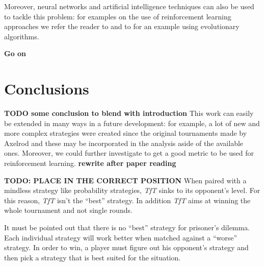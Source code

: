\documentclass[journal,a4paper,10pt,twoside]{IEEEtran} %
\begin{document}
Moreover, neural networks and artificial intelligence techniques can also be used to tackle this problem: for examples on the use of reinforcement learning approaches we refer the reader to \cite{sandholmRL,plosRLdominant,coopSeqRL,kedaoRL} and to \cite{shashiEvoAlg} for an example using evolutionary algorithms.

\textbf{Go on}


\section{Conclusions} \label{s:conc}
\textbf{TODO some conclusion to blend with introduction}
This work can easily be extended in many ways in a future development: for example, a lot of new and more complex strategies were created since the original tournaments made by Axelrod and these may be incorporated in the analysis aside of the available ones.
Moreover, we could further investigate to get a good metric to be used for reinforcement learning. \textbf{rewrite after paper reading}

\textbf{TODO: PLACE IN THE CORRECT POSITION}
When paired with a mindless strategy like probability strategies, \textit{TfT} sinks to its opponent's level. For this reason, \textit{TfT} isn't the ``best'' strategy. In addition \textit{TfT} aims at winning the whole tournament and not single rounds.

It must be pointed out that there is no ``best'' strategy for prisoner's dilemma. Each individual strategy will work better when matched against a ``worse'' strategy. In order to win, a player must figure out his opponent's strategy and then pick a strategy that is best suited for the situation.

\balance



\pagebreak
\onecolumn
{}

\end{document}
